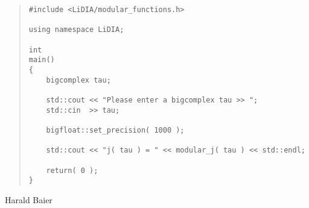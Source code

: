 
\SEEALSO




\EXAMPLES

\begin{quote}
\begin{verbatim}
#include <LiDIA/modular_functions.h>

using namespace LiDIA;

int
main()
{
    bigcomplex tau;

    std::cout << "Please enter a bigcomplex tau >> ";
    std::cin  >> tau;

    bigfloat::set_precision( 1000 );

    std::cout << "j( tau ) = " << modular_j( tau ) << std::endl;

    return( 0 );
}
\end{verbatim}
\end{quote}



\AUTHOR

Harald Baier
